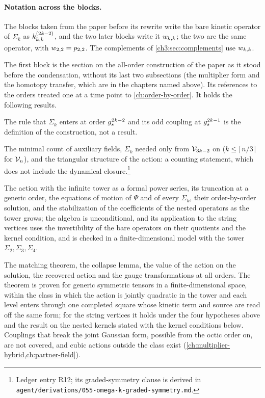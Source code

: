 \paragraph{Notation across the blocks.}

The blocks taken from the paper before its rewrite write the bare kinetic operator of $\Sigma_k$ as $\kin{k}{}{2 k - 2}$, and the two later blocks write it $w_{k,k}$; the two are the same operator, with $w_{2,2} = p_{2,2}$.
The complements of \cref{ch3:sec:complements} use $w_{k,k}$.

The first block is the section on the all-order construction of the paper as it stood before the condensation, without its last two subsections (the multiplier form and the homotopy transfer, which are in the chapters named above).
Its references to the orders treated one at a time point to \cref{ch:order-by-order}.
It holds the following results.

The rule that $\Sigma_k$ enters at order $g_s^{2 k - 2}$ and its odd coupling at $g_s^{2 k - 1}$ is the definition of the construction, not a result.

\noindent{} The minimal count of auxiliary fields, $\Sigma_k$ needed only from $\mathcal{V}_{3 k - 2}$ on ($k \le \lceil n / 3 \rceil$ for $\mathcal{V}_{n}$), and the triangular structure of the action: a counting statement, which does not include the dynamical closure.\footnote{Ledger entry R12; its graded-symmetry clause is derived in \nolinkurl{agent/derivations/055-omega-k-graded-symmetry.md}.}

\noindent{} The action with the infinite tower as a formal power series, its truncation at a generic order, the equations of motion of $\Psi$ and of every $\Sigma_k$, their order-by-order solution, and the stabilization of the coefficients of the nested operators as the tower grows; the algebra is unconditional, and its application to the string vertices uses the invertibility of the bare operators on their quotients and the kernel condition, and is checked in a finite-dimensional model with the tower $\Sigma_2, \Sigma_3, \Sigma_4$.

\noindent{} The matching theorem, the collapse lemma, the value of the action on the solution, the recovered action and the gauge transformations at all orders.
The theorem is proven for generic symmetric tensors in a finite-dimensional space, within the class in which the action is jointly quadratic in the tower and each level enters through one completed square whose kinetic term and source are read off the same form; for the string vertices it holds under the four hypotheses above and the result on the nested kernels stated with the kernel conditions below.
Couplings that break the joint Gaussian form, possible from the octic order on, are not covered, and cubic actions outside the class exist (\cref{ch:multiplier-hybrid,ch:partner-field}).


